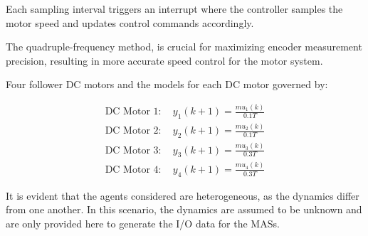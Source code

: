 \documentclass[journal,onecolumn]{IEEEtran}
\begin{document}






Each sampling interval triggers an interrupt where the controller samples the motor speed and updates control commands accordingly.

The quadruple-frequency method,  is crucial for maximizing encoder measurement precision, resulting in more accurate speed control for the motor system.

Four follower DC motors and the models for each DC motor governed by:

\[
\begin{array}{c}
\text{DC Motor 1}: \quad y_1(k+1) = \frac{m u_1(k)}{0.1 T}\\
\text{DC Motor 2}: \quad y_2(k+1) = \frac{m u_2(k)}{0.1 T } \\
\text{DC Motor 3}: \quad y_3(k+1) = \frac{m u_3(k)}{0.3 T } \\
\text{DC Motor 4}: \quad y_4(k+1) = \frac{m u_4(k)}{0.3 T } 
\end{array}
\]


It is evident that the agents considered are heterogeneous, as the dynamics differ from one another. In this scenario, the dynamics are assumed to be unknown and are only provided here to generate the I/O data for the MASs. 
\end{document}
